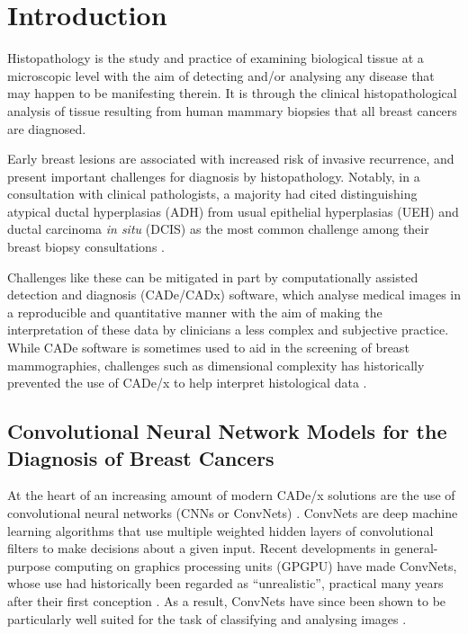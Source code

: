 \section{Introduction}

Histopathology is the study and practice of examining biological tissue at a microscopic level with the aim of detecting and/or analysing any disease that may happen to be manifesting therein. It is through the clinical histopathological analysis of tissue resulting from human mammary biopsies that all breast cancers are diagnosed.\par

Early breast lesions are associated with increased risk of invasive recurrence, and present important challenges for diagnosis by histopathology. Notably, in a consultation with clinical pathologists, a majority had cited distinguishing atypical ductal hyperplasias (ADH) from usual epithelial hyperplasias (UEH) and ductal carcinoma \textit{in situ} (DCIS) as the most common challenge among their breast biopsy consultations \citep{putti2005}.\par

Challenges like these can be mitigated in part by computationally assisted detection and diagnosis (CADe/CADx) software, which analyse medical images in a reproducible and quantitative manner with the aim of making the interpretation of these data by clinicians a less complex and subjective practice. While CADe software is sometimes used to aid in the screening of breast mammographies, challenges such as dimensional complexity has historically prevented the use of CADe/x to help interpret histological data \citep{rangayyan2007,madabhushi2009}.  \par



\subsection{Convolutional Neural Network Models for the Diagnosis of Breast Cancers}

At the heart of an increasing amount of modern CADe/x solutions are the use of convolutional neural networks (CNNs or ConvNets) \citep{shin2016, cheng2016}. ConvNets are deep machine learning algorithms that use multiple weighted hidden layers of convolutional filters to make decisions about a given input. Recent developments in general-purpose computing on graphics processing units (GPGPU) have made ConvNets, whose use had historically been regarded as ``unrealistic'', practical many years after their first conception \citep{crick1989}. As a result, ConvNets have since been shown to be particularly well suited for the task of classifying and analysing images \citep{ciresan2011, ciresan2012}.\par

